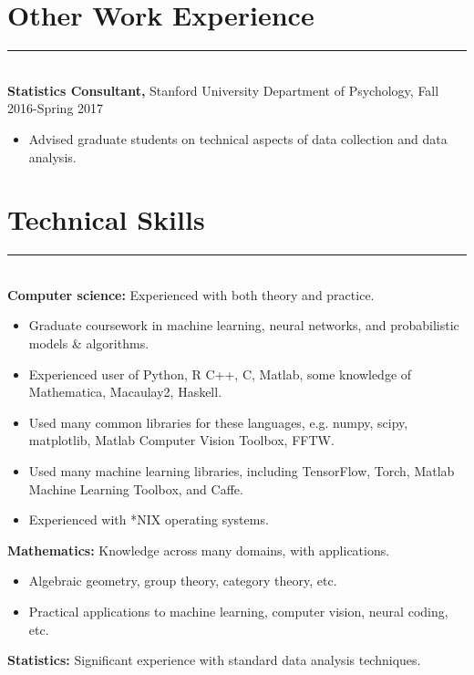 \documentclass[margin]{res}
\begin{document}
\begin{resume}
\vspace{1pt}\section{Other Work Experience} \vspace{-15pt} \rule{\textwidth}{0.5pt} \\[3pt]
{\bf Statistics Consultant,} Stanford University Department of Psychology, Fall 2016-Spring 2017
\begin{itemize} \itemsep -2pt
 \item Advised graduate students on technical aspects of data collection and data analysis. \end{itemize}
\vspace{1pt}\section{Technical Skills} \vspace{-15pt} \rule{\textwidth}{0.5pt} \\[3pt]
{\bf Computer science:} Experienced with both theory and practice. 
\begin{itemize} \itemsep -2pt
  \item Graduate coursework in machine learning, neural networks, and probabilistic models \& algorithms.
  \item Experienced user of Python, R C++, C, Matlab, some knowledge of Mathematica, Macaulay2, Haskell. 
  \item Used many common libraries for these languages, e.g. numpy, scipy, matplotlib, Matlab Computer Vision Toolbox, FFTW.
  \item Used many machine learning libraries, including TensorFlow, Torch, Matlab Machine Learning Toolbox, and Caffe.
  \item Experienced with *NIX operating systems.
\end{itemize}\vspace{-8pt}
{\bf Mathematics:} Knowledge across many domains, with applications.
\begin{itemize} \itemsep -2pt
\item Algebraic geometry, group theory, category theory, etc. \item Practical applications to machine learning, computer vision, neural coding, etc. \end{itemize}\vspace{-8pt}
{\bf Statistics:} Significant experience with standard data analysis techniques.
\begin{itemize} \itemsep -2pt

\end{itemize}
\end{resume}
\end{document}
